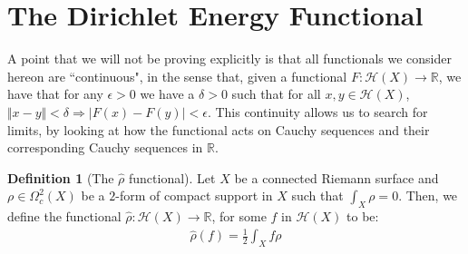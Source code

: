 \documentclass[11pt]{report}
\theoremstyle{definition}
\newtheorem{defn}[thm]{Definition}
\begin{document}
\section{The Dirichlet Energy Functional}

A point that we will not be proving explicitly is that all functionals we consider hereon are ``continuous", in the sense that, given a functional $F:\mathcal{H}(X) \rightarrow \mathbb{R}$, we have that for any $\epsilon > 0$ we have a $\delta > 0$ such that for all $x,y \in \mathcal{H}(X)$, $\Vert x - y \Vert < \delta \Rightarrow |F(x) - F(y)| < \epsilon$. This continuity allows us to search for limits, by looking at how the functional acts on Cauchy sequences and their corresponding Cauchy sequences in $\mathbb{R}$.

\begin{defn}[The $\hat{\rho}$ functional]
  Let $X$ be a connected Riemann surface and $\rho \in \Omega^2_c(X)$ be a $2$-form of compact support in $X$ such that $\int_X \rho = 0$. Then, we define the functional $\hat{\rho} \colon \mathcal{H}(X) \rightarrow \mathbb{R}$, for some $f$ in $\mathcal{H}(X)$ to be:
  \begin{align*}
    \hat{\rho}(f) = \frac{1}{2}\int_X f\rho
  \end{align*}
\end{defn}
\end{document}
